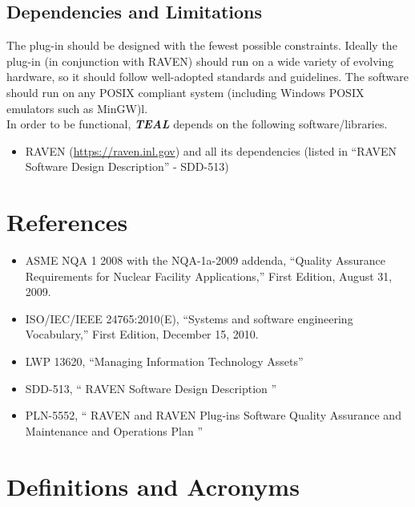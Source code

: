 \subsection{Dependencies and Limitations}
The plug-in should be designed with the fewest possible constraints. 
Ideally the  plug-in (in conjunction with RAVEN)
 should run on a wide variety of evolving hardware, 
so it should follow well-adopted standards and guidelines. The software
 should run on any POSIX compliant system (including Windows POSIX 
 emulators such as MinGW)l. 
\\In order to be functional, \textit{\textbf{TEAL}} depends on the following software/libraries.
\begin{itemize}
  \item RAVEN (\url{https://raven.inl.gov}) and all its dependencies (listed in ``RAVEN Software Design Description'' - SDD-513)
\end{itemize}


\section{References}

\begin{itemize}

  \item ASME NQA 1 2008 with the NQA-1a-2009 addenda, ``Quality Assurance Requirements for Nuclear Facility Applications,'' First Edition, August 31, 2009.
  \item ISO/IEC/IEEE 24765:2010(E), ``Systems and software engineering Vocabulary,'' First Edition, December 15, 2010.
  \item LWP 13620, ``Managing Information Technology Assets''
  \item SDD-513, `` RAVEN Software Design Description ''
  \item PLN-5552, `` RAVEN and RAVEN Plug-ins Software Quality Assurance and Maintenance and Operations Plan ''
\end{itemize}


\section{Definitions and Acronyms}

